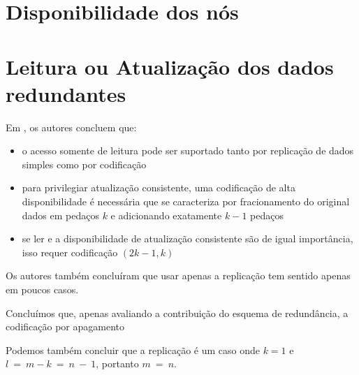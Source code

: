\section{Disponibilidade dos nós}

\section{Leitura ou Atualização dos dados redundantes}

Em \cite{Chiola:2005}, os autores concluem que:

\begin{itemize}
  \item o acesso somente de leitura pode ser suportado tanto por replicação de dados simples como por codificação
  \item para privilegiar atualização consistente, uma codificação de alta disponibilidade é necessária que se caracteriza por fracionamento do original dados em pedaços $k$ e adicionando exatamente $k-1$ pedaços
  \item se ler e a disponibilidade de atualização consistente são de igual importância, isso requer codificação $(2k-1, k)$
\end{itemize}

Os autores também concluíram que usar apenas a replicação tem sentido apenas em poucos casos.

Concluímos que, apenas avaliando a contribuição do esquema de redundância, a codificação por apagamento 

Podemos também concluir que a replicação é um caso onde $k = 1$ e $l\ =\ m - k\ = \ n\ -\ 1$, portanto $m\ =\ n$. 
